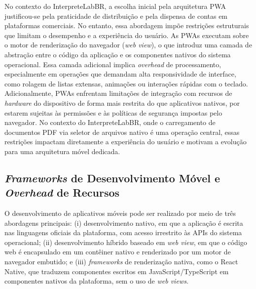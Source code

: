 \documentclass[12pt]{article}
\begin{document}
No contexto do InterpreteLabBR, a escolha inicial pela arquitetura PWA
justificou-se pela praticidade de distribuição e pela dispensa de contas em
plataformas comerciais. No entanto, essa abordagem impõe restrições
estruturais que limitam o desempenho e a experiência do usuário. As PWAs
executam sobre o motor de renderização do navegador (\textit{web view}), o
que introduz uma camada de abstração entre o código da aplicação e os
componentes nativos do sistema operacional. Essa camada adicional implica
\textit{overhead} de processamento, especialmente em operações que
demandam alta responsividade de interface, como rolagem de listas extensas,
animações ou interações rápidas com o teclado. Adicionalmente, PWAs
enfrentam limitações de integração com recursos de \textit{hardware} do
dispositivo de forma mais restrita do que aplicativos nativos, por estarem
sujeitas às permissões e às políticas de segurança impostas pelo navegador.
No contexto do InterpreteLabBR, onde o carregamento de documentos PDF via
seletor de arquivos nativo é uma operação central, essas restrições
impactam diretamente a experiência do usuário e motivam a evolução para uma
arquitetura móvel dedicada.

\subsection{\textit{Frameworks} de Desenvolvimento Móvel e \textit{Overhead} de Recursos}

O desenvolvimento de aplicativos móveis pode ser realizado por meio de três
abordagens principais: (i) desenvolvimento nativo, em que a aplicação é
escrita nas linguagens oficiais da plataforma, com acesso irrestrito às
APIs do sistema operacional; (ii) desenvolvimento híbrido baseado em
\textit{web view}, em que o código web é encapsulado em um contêiner nativo
e renderizado por um motor de navegador embutido; e (iii) \textit{frameworks}
de renderização nativa, como o React Native, que traduzem componentes
escritos em JavaScript/TypeScript em componentes nativos da plataforma, sem
o uso de \textit{web views}.
\end{document}
